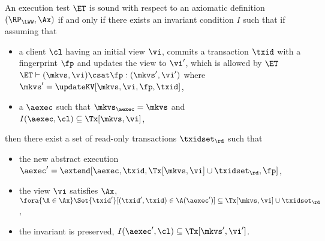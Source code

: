 \begin{definition}
\label{def:et_sound}
An execution test $\ET$ is sound with respect to an axiomatic 
definition $(\RP_{\LWW}, \Ax)$ if and only if
there exists an invariant condition $I$ such that 
if assuming that
\begin{itemize}
    \item a client \( \cl \) having an initial view \( \vi \), 
        commits a transaction \( \txid \) with a fingerprint \( \fp \) and updates the view to \( \vi' \), 
        which is allowed by \( \ET \) \ie $\ET \vdash (\mkvs, \vi) \csat \fp: (\mkvs',\vi')$ where \( \mkvs' = \updateKV[\mkvs, \vi ,\fp, \txid]\),
    \item a $\aexec$ such that $\mkvs_{\aexec} = \mkvs$ and $I(\aexec, \cl) \subseteq \Tx[\mkvs, \vi]$,
\end{itemize}
then there exist a set of read-only transactions $\txidset_{\rd}$ such that 
\begin{itemize}
    \item the new abstract execution \( \aexec'  = \extend[\aexec,\txid,\Tx[\mkvs,\vi] \cup \txidset_\rd, \fp]\),
    \item the view \( \vi \) satisfies \( \Ax \), \ie $\fora{ \A \in \Ax } \Set{\txid' }[ (\txid', \txid) \in \A(\aexec')] \subseteq \Tx[\mkvs, \vi] \cup \txidset_{\rd}$, 
    \item the invariant is preserved, \ie $I(\aexec', \cl) \subseteq \Tx[\mkvs', \vi']$.
\end{itemize}
\end{definition}


